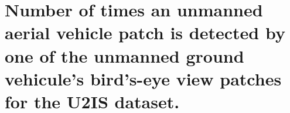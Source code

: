 \chapter{Number of times an unmanned aerial vehicle patch is detected by one of the unmanned ground vehicule's bird's-eye view patches for the U2IS dataset.}\label{ch:full_patch_detection_hubdrone}
\begin{table}[ht!]
    \centering
    \caption{Number of times a \gls{uav} patch is detected by either of the \gls{ugv} \gls{bev} patches.
    Each row corresponds to one node. The first 10 columns indicate the number of times each patch is detected.
    The last column shows the ratio of patches detected at least once to the total number of patches in the node.}
    \label{tab:appendix:full_patch_detection_hub_drone}
\end{table}